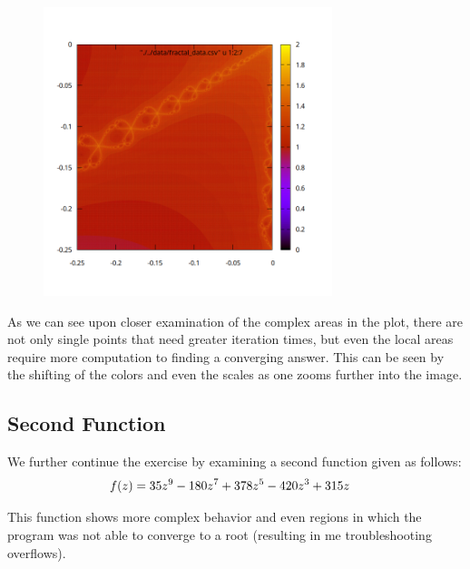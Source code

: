 \documentclass[12pt]{article}
\DeclarePairedDelimiter\rb{(}{)}
\begin{document}
     \begin{figure}[ht]
    \centering
    \includegraphics[width=0.75\textwidth]{./../problem04/plots/fractal_plot-02_06_iter.png}
    \label{fig:02_06}
\end{figure}

As we can see upon closer examination of the complex areas in the plot, there are not only single points that need greater iteration times, but even the local areas require more computation to finding a converging answer. This can be seen by the shifting of the colors and even the scales as one zooms further into the image. 

\subsection{Second Function}
\label{subsec:second}

We further continue the exercise by examining a second function given as follows:
\begin{align*}
	f \rb*{z} & =  35 z^{9} - 180 z^{7} + 378 z^{5} - 420 z^{3} + 315 z &\\
\end{align*}

This function shows more complex behavior and even regions in which the program was not able to converge to a root (resulting in me troubleshooting overflows). 
\end{document}
